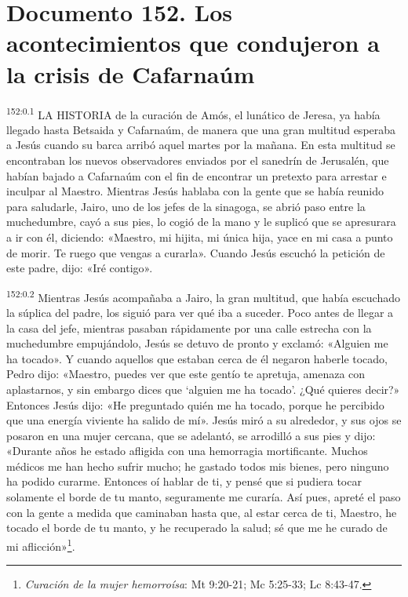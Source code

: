 \chapter{Documento 152. Los acontecimientos que condujeron a la crisis de Cafarnaúm}
\par
\textsuperscript{152:0.1} LA HISTORIA de la curación de Amós, el lunático de Jeresa, ya había llegado hasta Betsaida y Cafarnaúm, de manera que una gran multitud esperaba a Jesús cuando su barca arribó aquel martes por la mañana. En esta multitud se encontraban los nuevos observadores enviados por el sanedrín de Jerusalén, que habían bajado a Cafarnaúm con el fin de encontrar un pretexto para arrestar e inculpar al Maestro. Mientras Jesús hablaba con la gente que se había reunido para saludarle, Jairo, uno de los jefes de la sinagoga, se abrió paso entre la muchedumbre, cayó a sus pies, lo cogió de la mano y le suplicó que se apresurara a ir con él, diciendo: «Maestro, mi hijita, mi única hija, yace en mi casa a punto de morir. Te ruego que vengas a curarla». Cuando Jesús escuchó la petición de este padre, dijo: «Iré contigo».

\par
\textsuperscript{152:0.2} Mientras Jesús acompañaba a Jairo, la gran multitud, que había escuchado la súplica del padre, los siguió para ver qué iba a suceder. Poco antes de llegar a la casa del jefe, mientras pasaban rápidamente por una calle estrecha con la muchedumbre empujándolo, Jesús se detuvo de pronto y exclamó: «Alguien me ha tocado». Y cuando aquellos que estaban cerca de él negaron haberle tocado, Pedro dijo: «Maestro, puedes ver que este gentío te apretuja, amenaza con aplastarnos, y sin embargo dices que `alguien me ha tocado'. ¿Qué quieres decir?» Entonces Jesús dijo: «He preguntado quién me ha tocado, porque he percibido que una energía viviente ha salido de mí». Jesús miró a su alrededor, y sus ojos se posaron en una mujer cercana, que se adelantó, se arrodilló a sus pies y dijo: «Durante años he estado afligida con una hemorragia mortificante. Muchos médicos me han hecho sufrir mucho; he gastado todos mis bienes, pero ninguno ha podido curarme. Entonces oí hablar de ti, y pensé que si pudiera tocar solamente el borde de tu manto, seguramente me curaría. Así pues, apreté el paso con la gente a medida que caminaban hasta que, al estar cerca de ti, Maestro, he tocado el borde de tu manto, y he recuperado la salud; sé que me he curado de mi aflicción»\footnote{\textit{Curación de la mujer hemorroísa}: Mt 9:20-21; Mc 5:25-33; Lc 8:43-47.}.

